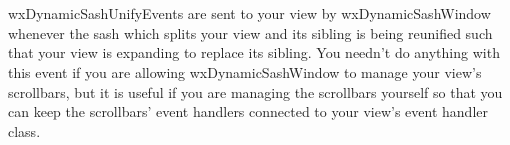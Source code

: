 %
%


\section{}\label{wxdynamicsashunifyevent}


wxDynamicSashUnifyEvents are sent to your view by wxDynamicSashWindow
    whenever the sash which splits your view and its sibling is being
    reunified such that your view is expanding to replace its sibling.
    You needn't do anything with this event if you are allowing
    wxDynamicSashWindow to manage your view's scrollbars, but it is useful
    if you are managing the scrollbars yourself so that you can keep
    the scrollbars' event handlers connected to your view's event handler
    class.






\label{wxdynamicsashunifyeventwxdynamicsashunifyevent}







\label{wxdynamicsashunifyeventclone}


